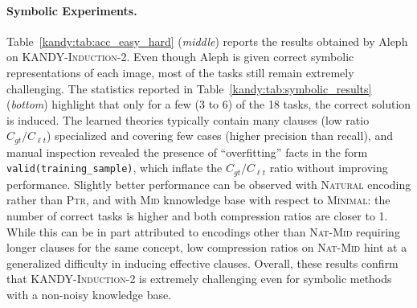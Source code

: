 \paragraph{Symbolic Experiments.}
Table~\ref{kandy:tab:acc_easy_hard} ({\it middle}) reports the results obtained by Aleph on \textsc{KANDY-Induction-2}. Even though Aleph is given correct symbolic representations of each image, most of the tasks still remain extremely challenging. The statistics reported in Table~\ref{kandy:tab:symbolic_results} ({\it bottom}) highlight that only for a few (3 to 6) of the 18 tasks, the correct solution is induced. The learned theories typically contain many clauses (low ratio $C_{gt} / C_{\ell t}$) specialized and covering few cases (higher precision than recall), and manual inspection revealed the presence of ``overfitting'' facts in the form \texttt{valid(training\_sample)}, which inflate the $C_{gt} / C_{\ell t}$ ratio without improving performance. Slightly better performance can be observed with \textsc{Natural} encoding rather than \textsc{Ptr}, and with \textsc{Mid} knnowledge base with respect to \textsc{Minimal}: the number of correct tasks is higher and both compression ratios are closer to 1. 
While this can be in part attributed to encodings other than \textsc{Nat-Mid} requiring longer clauses for the same concept, low compression ratios on \textsc{Nat-Mid} hint at a generalized difficulty in inducing effective clauses. Overall, these results confirm that \textsc{KANDY-Induction-2} is extremely challenging even for symbolic methods with a non-noisy knowledge base.


